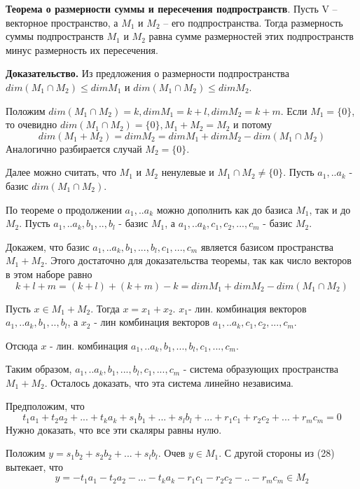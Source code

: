 \documentclass[a4paper]{article}
\begin{document}
\textbf{Теорема о размерности суммы и пересечения подпространств}. Пусть V – векторное пространство, а $M_1$ и $M_2$ – его подпространства.
Тогда размерность суммы подпространств $M_1$ и $M_2$ равна сумме размерностей этих подпространств минус размерность их пересечения. 

\textbf{Доказательство.} Из предложения о размерности подпространства $dim(M_1 \cap M_2) \leq dim M_1$ и $dim(M_1 \cap M_2) \leq dim M_2$.

Положим $dim(M_1 \cap M_2) = k, dim M_1 = k + l, dim M_2 = k + m$. Если $M_1 = \{ 0 \}$, то очевидно $dim(M_1 \cap M_2) = \{ 0 \}, M_1 + M_2  = M_2$ и потому 
\begin{equation}
dim(M_1 + M_2) = dim M_2 = dim M_1 + dim M_2 - dim(M_1 \cap M_2)
\end{equation}
Аналогично разбирается случай $M_2 = \{ 0 \} $. 

Далее можно считать, что $M_1$ и $M_2$ ненулевые и $M_1 \cap M_2 \neq \{ 0 \}$. Пусть $a_1, .. a_k$ - базис $dim(M_1 \cap M_2)$.

По теореме о продолжении $a_1, .. a_k$ можно дополнить как до базиса $M_1$, так и до $M_2$. Пусть $a_1, .. a_k, b_1, .., b_l$ - базис $M_1$, а $a_1, .. a_k,c_1, c_2, ..., c_m$ - базис $M_2$.

Докажем, что базис $a_1, .. a_k, b_1, ..., b_l, c_1, ..., c_m$ является базисом пространства $M_1 + M_2$. Этого достаточно для доказательства теоремы, так как число векторов в этом наборе равно \begin{equation}
k + l + m = (k+l) + (k+m) - k = dim M_1 + dim M_2 -dim (M_1 \cap M_2)
\end{equation}

Пусть $x \in M_1 + M_2$. Тогда $x = x_1 + x_2$. $x_1 $- лин. комбинация векторов $a_1, .. a_k, b_1, .., b_l$, а $x_2$ - лин комбинация векторов $a_1, .. a_k,c_1, c_2, ..., c_m$.

Отсюда $x$ - лин. комбинация $a_1, .. a_k, b_1, ..., b_l, c_1, ..., c_m$. 

Таким образом, $a_1, .. a_k, b_1, ..., b_l, c_1, ..., c_m$ - система образующих пространства $M_1 + M_2$. Осталось доказать, что эта система линейно независима.

Предположим, что
 \begin{equation}
t_1a_1 + t_2a_2 + ... +t_ka_k + s_1b_1 + ... + s_lb_l + ... + r_1c_1 + r_2c_2 + ... + r_mc_m = 0
\end{equation} 
Нужно доказать, что все эти скаляры равны нулю.

Положим $y = s_1b_2 +s_2b_2 + ... + s_lb_l$. Очев $y \in M_1$. С другой стороны из (28) вытекает, что \begin{equation}
y = -t_1a_1 - t_2a_2 -... -t_ka_k - r_1c_1 -r_2c_2 -.. -r_mc_m \in M_2
\end{equation}
\end{document}
